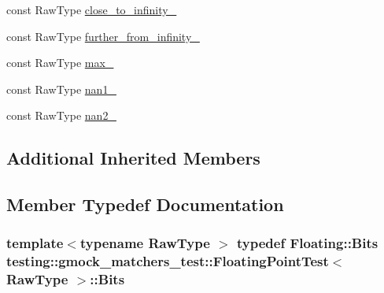 \begin{DoxyCompactItemize}
const Raw\+Type \hyperlink{classtesting_1_1gmock__matchers__test_1_1FloatingPointTest_a6fc8ac2030f4883e1c84da3a21bbb7c3}{close\+\_\+to\+\_\+infinity\+\_\+}
\item 
const Raw\+Type \hyperlink{classtesting_1_1gmock__matchers__test_1_1FloatingPointTest_a603ab51280ecb1c4147c2660a7a90728}{further\+\_\+from\+\_\+infinity\+\_\+}
\item 
const Raw\+Type \hyperlink{classtesting_1_1gmock__matchers__test_1_1FloatingPointTest_a17b9dd56136b64fa7210bfe024d88c30}{max\+\_\+}
\item 
const Raw\+Type \hyperlink{classtesting_1_1gmock__matchers__test_1_1FloatingPointTest_a0d2544956414eac21d4519fe600e4603}{nan1\+\_\+}
\item 
const Raw\+Type \hyperlink{classtesting_1_1gmock__matchers__test_1_1FloatingPointTest_a4af3b3e53a06d271479ff30f5d5ee155}{nan2\+\_\+}
\end{DoxyCompactItemize}
\subsection*{Additional Inherited Members}


\subsection{Member Typedef Documentation}
\subsubsection[{\texorpdfstring{Bits}{Bits}}]{\setlength{\rightskip}{0pt plus 5cm}template$<$typename Raw\+Type $>$ typedef {\bf Floating\+::\+Bits} {\bf testing\+::gmock\+\_\+matchers\+\_\+test\+::\+Floating\+Point\+Test}$<$ Raw\+Type $>$\+::{\bf Bits}\hspace{0.3cm}{\ttfamily [protected]}}\hypertarget{classtesting_1_1gmock__matchers__test_1_1FloatingPointTest_addf899bd832ae51103198d201d2f2ea2}{}\label{classtesting_1_1gmock__matchers__test_1_1FloatingPointTest_addf899bd832ae51103198d201d2f2ea2}
